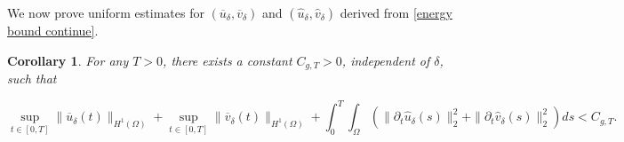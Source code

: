 \documentclass[reqno,12pt,twoside]{amsart}
\newtheorem{corollary}{Corollary}[section]
\numberwithin{equation}{section} \numberwithin{theorem}{section}
\numberwithin{proposition}{section} \numberwithin{lemma}{section}
\numberwithin{corollary}{section}
\numberwithin{definition}{section} \numberwithin{remark}{section}
\begin{document}
We now prove uniform estimates for $(\overline{u}_\delta, \overline{v}_\delta)$ and $(\hat{u}_\delta, \hat{v}_\delta)$ derived from \eqref{energy bound continue}. 

\begin{corollary}\label{cor h1 bound}
For any $T >0$, there exists a constant $C_{g,T} >0$, independent of $\delta$, such that 

\begin{equation}\label{bound overline+hat}
\sup_{t\in [0,T]} \|\overline{u}_\delta (t)\|_{H^1(\Omega)}+ \sup_{t\in [0,T]} \|\overline{v}_\delta (t)\|_{H^1(\Omega)}+ \int_0^T \int_\Omega \left(\|\partial_t \hat{u}_\delta(s)\|_2^2  + \|\partial_t \hat{v}_\delta(s)\|_2^2\right) ds < C_{g,T}.
\end{equation}
%
\end{corollary}
\end{document}
